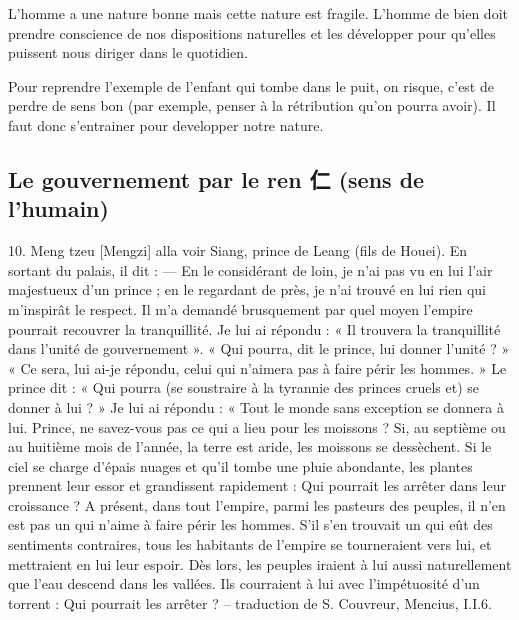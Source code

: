 \begin{Synthesis}
L'homme a une nature bonne mais cette nature est fragile.
L'homme de bien doit prendre conscience de nos dispositions naturelles et les développer pour qu'elles puissent nous diriger dans le quotidien.
\end{Synthesis}

\begin{Ex}
    Pour reprendre l'exemple de l'enfant qui tombe dans le puit, on risque, c'est de perdre de sens bon (par exemple, penser à la rétribution qu'on pourra avoir). Il faut donc s'entrainer pour developper notre nature.
\end{Ex}



 \subsection{Le gouvernement par le ren 仁 (sens de l’humain)}

\begin{singlequote}
10.	Meng tzeu [Mengzi] alla voir Siang, prince de Leang (fils de Houei). En sortant du palais, il dit :
—	En le considérant de loin, je n’ai pas vu en lui l’air majestueux d’un prince ; en le regardant de près, je n’ai trouvé en lui rien qui m’inspirât le respect. Il m’a demandé brusquement par quel moyen l’empire pourrait recouvrer la tranquillité. Je lui ai répondu : « Il trouvera la tranquillité dans l’unité de gouvernement ». « Qui pourra, dit le prince, lui donner l’unité ? » « Ce sera, lui ai-je répondu, celui qui n’aimera pas à faire périr les hommes. » Le prince dit : « Qui pourra (se soustraire à la tyrannie des princes cruels et) se donner à lui ? »
Je lui ai répondu : « Tout le monde sans exception se donnera à lui. Prince, ne savez-vous pas ce qui a lieu pour les moissons ? Si, au septième ou au huitième mois de l’année, la terre est aride, les moissons se dessèchent. Si le ciel se charge d’épais nuages et qu’il tombe une pluie abondante, les plantes prennent leur essor et grandissent rapidement : Qui pourrait les arrêter dans leur croissance ? A présent, dans tout l’empire, parmi les pasteurs des peuples, il n’en est pas un qui n’aime à faire périr les hommes. S’il s’en trouvait un qui eût des sentiments contraires, tous les habitants de l’empire se tourneraient vers lui, et mettraient en lui leur espoir. Dès lors, les peuples iraient à lui aussi naturellement que l’eau descend dans les vallées. Ils courraient à lui avec l’impétuosité d’un torrent : Qui pourrait les arrêter ?
-- traduction de S. Couvreur, Mencius, I.I.6.
    
\end{singlequote}


